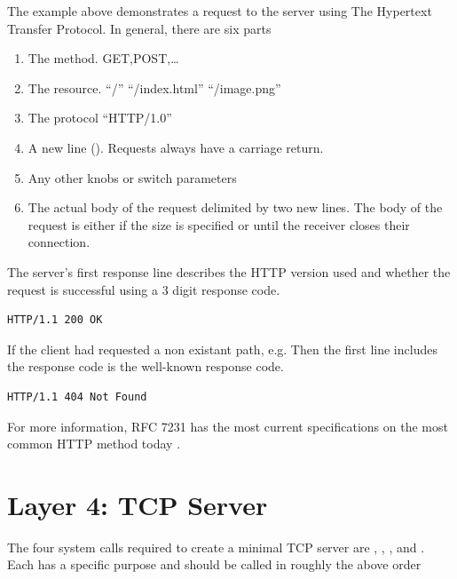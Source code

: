 The example above demonstrates a request to the server using The Hypertext Transfer Protocol.
In general, there are six parts

\begin{enumerate}
\item The method. GET,POST,\ldots{}
\item The resource. ``/'' ``/index.html'' ``/image.png''
\item The protocol ``HTTP/1.0''
\item A new line (\keyword{\\r\\n}). Requests always have a carriage return.
\item Any other knobs or switch parameters
\item The actual body of the request delimited by two new lines. The body of the request is either if the size is specified or until the receiver closes their connection.
\end{enumerate}

The server's first response line describes the HTTP version used and whether the request is successful using a 3 digit response code.

\begin{lstlisting}
HTTP/1.1 200 OK
\end{lstlisting}

If the client had requested a non existant path, e.g.
 Then the first line includes the response code is the well-known  response code.

\begin{lstlisting}
HTTP/1.1 404 Not Found
\end{lstlisting}

For more information, RFC 7231 has the most current specifications on the most common HTTP method today \cite{rfc7231}.

\section{Layer 4: TCP Server}

The four system calls required to create a minimal TCP server are , , , and .
Each has a specific purpose and should be called in roughly the above order

